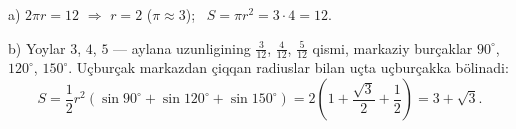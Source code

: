a) $2\pi r=12$ $\Rightarrow$ $r=2$ ($\pi\approx3$); \ $S=\pi r^2=3\cdot4=12$.

b) Yoylar $3$, $4$, $5$ — aylana uzunligining $\frac3{12}$, $\frac4{12}$, $\frac5{12}$ qismi, markaziy burçaklar $90^\circ$, $120^\circ$, $150^\circ$. Uçburçak markazdan çiqqan radiuslar bilan uçta uçburçakka bölinadi:
\[S=\frac12r^2\left(\sin90^\circ+\sin120^\circ+\sin150^\circ\right)=2\left(1+\frac{\sqrt3}2+\frac12\right)=3+\sqrt3.\]

\ShowJavoblar

